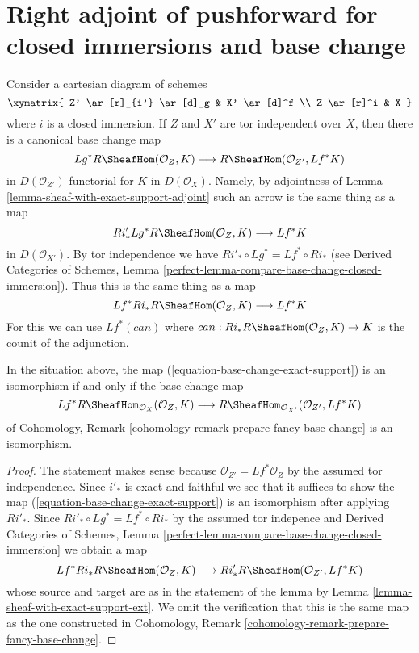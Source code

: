 \section{Right adjoint of pushforward for closed immersions and base change}
\label{section-sections-with-exact-support-base-change}

\noindent
Consider a cartesian diagram of schemes
$$
\xymatrix{
Z' \ar[r]_{i'} \ar[d]_g & X' \ar[d]^f \\
Z \ar[r]^i & X
}
$$
where $i$ is a closed immersion. If $Z$ and $X'$ are
tor independent over $X$, then there is a canonical
base change map
\begin{equation}
\label{equation-base-change-exact-support}
Lg^*R\SheafHom(\mathcal{O}_Z, K)
\longrightarrow
R\SheafHom(\mathcal{O}_{Z'}, Lf^*K)
\end{equation}
in $D(\mathcal{O}_{Z'})$ functorial for $K$ in $D(\mathcal{O}_X)$.
Namely, by adjointness of Lemma \ref{lemma-sheaf-with-exact-support-adjoint}
such an arrow is the same thing as a map
$$
Ri'_*Lg^*R\SheafHom(\mathcal{O}_Z, K)
\longrightarrow
Lf^*K
$$
in $D(\mathcal{O}_{X'})$. By tor independence we have
$Ri'_* \circ Lg^* = Lf^* \circ Ri_*$ (see
Derived Categories of Schemes, Lemma
\ref{perfect-lemma-compare-base-change-closed-immersion}).
Thus this is the same thing as a map
$$
Lf^*Ri_*R\SheafHom(\mathcal{O}_Z, K)
\longrightarrow
Lf^*K
$$
For this we can use $Lf^*(can)$ where
$can : Ri_* R\SheafHom(\mathcal{O}_Z, K) \to K$ is the
counit of the adjunction.

\begin{lemma}
\label{lemma-check-base-change-is-iso}
In the situation above, the map (\ref{equation-base-change-exact-support})
is an isomorphism if and only if the base change map
$$
Lf^*R\SheafHom_{\mathcal{O}_X}(\mathcal{O}_Z, K)
\longrightarrow
R\SheafHom_{\mathcal{O}_{X'}}(\mathcal{O}_{Z'}, Lf^*K)
$$
of Cohomology, Remark \ref{cohomology-remark-prepare-fancy-base-change}
is an isomorphism.
\end{lemma}

\begin{proof}
The statement makes sense because $\mathcal{O}_{Z'} = Lf^*\mathcal{O}_Z$
by the assumed tor independence.
Since $i'_*$ is exact and faithful we see that it suffices to show
the map (\ref{equation-base-change-exact-support})
is an isomorphism after applying $Ri'_*$. Since
$Ri'_* \circ Lg^* = Lf^* \circ Ri_*$ by the assumed tor indepence and
Derived Categories of Schemes, Lemma
\ref{perfect-lemma-compare-base-change-closed-immersion}
we obtain a map
$$
Lf^*Ri_*R\SheafHom(\mathcal{O}_Z, K)
\longrightarrow
Ri'_*R\SheafHom(\mathcal{O}_{Z'}, Lf^*K)
$$
whose source and target are as in the statement of the lemma by
Lemma \ref{lemma-sheaf-with-exact-support-ext}. We omit the
verification that this is the same map as the one constructed
in Cohomology, Remark \ref{cohomology-remark-prepare-fancy-base-change}.
\end{proof}

